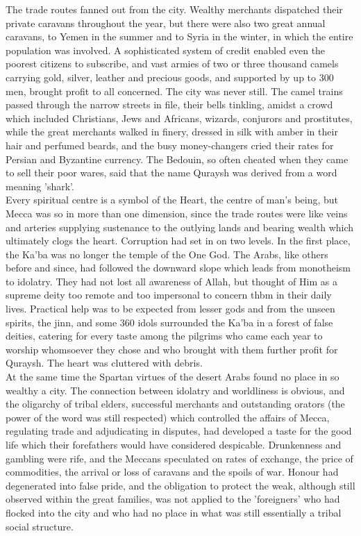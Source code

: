 \documentclass[11pt, b5paper, twoside]{book}
\begin{document}
The trade routes fanned out from the city. Wealthy merchants dispatched their private caravans 
throughout the year, but there were also two great annual caravans, to Yemen in the summer and to 
Syria in the winter, in which the entire population was involved. A sophisticated system of credit 
enabled even the poorest citizens to subscribe, and vast armies of two or three thousand camels 
carrying gold, silver, leather and precious goods, and supported by up to 300 men, brought profit to 
all concerned. The city was never still. The camel trains passed through the narrow streets in file, 
their bells tinkling, amidst a crowd which included Christians, Jews and Africans, wizards, conjurors 
and prostitutes, while the great merchants walked in finery, dressed in silk with amber in their hair 
and perfumed beards, and the busy money-changers cried their rates for Persian and Byzantine 
currency. The Bedouin, so often cheated when they came to sell their poor wares, said that the name 
Quraysh was derived from a word meaning 'shark'. \\

Every spiritual centre is a symbol of the Heart, the centre of man's being, but Mecca was so in more 
than one dimension, since the trade routes were like veins and arteries supplying sustenance to the 
outlying lands and bearing wealth which ultimately clogs the heart. Corruption had set in on two 
levels. In the first place, the Ka'ba was no longer the temple of the One God. The Arabs, like others 
before and since, had followed the downward slope which leads from monotheism to idolatry. They had 
not lost all awareness of Allah, but thought of Him as a supreme deity too remote and too impersonal 
to concern thbm in their daily lives. Practical help was to be expected from lesser gods and from the 
unseen spirits, the jinn, and some 360 idols surrounded the Ka'ba in a forest of false deities, 
catering for every taste among the pilgrims who came each year to worship whomsoever they chose and 
who brought with them further profit for Quraysh. The heart was cluttered with debris. \\

At the same time the Spartan virtues of the desert Arabs found no place in so wealthy a city. The 
connection between idolatry and worldliness is obvious, and the oligarchy of tribal elders, 
successful merchants and outstanding orators (the power of the word was still respected) which 
controlled the affairs of Mecca, regulating trade and adjudicating in disputes, had developed a taste 
for the good life which their forefathers would have considered despicable. Drunkenness and gambling 
were rife, and the Meccans speculated on rates of exchange, the price of commodities, the arrival or 
loss of caravans and the spoils of war. Honour had degenerated into false pride, and the obligation 
to protect the weak, although still observed within the great families, was not applied to the 
'foreigners' who had flocked into the city and who had no place in what was still essentially a 
tribal social structure. \\
\end{document}
